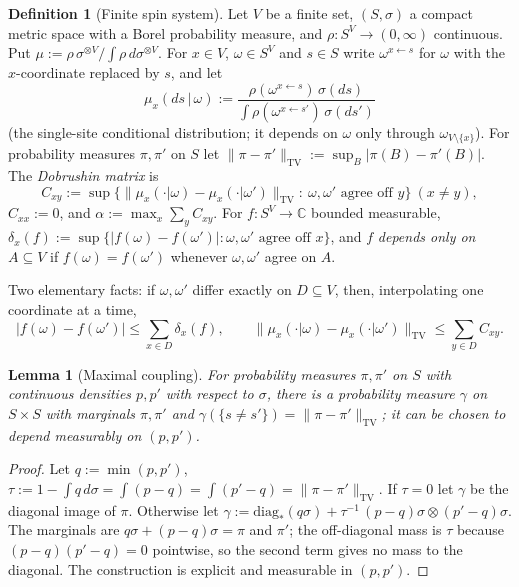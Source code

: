 \documentclass[11pt,a4paper]{article}
\newtheorem{lemma}[theorem]{Lemma}
\theoremstyle{definition}
\newtheorem{definition}[theorem]{Definition}
\theoremstyle{remark}
\newcommand{\C}{\mathbb{C}}
\newcommand{\norm}[1]{\lVert #1\rVert}
\newcommand{\TV}{\mathrm{TV}}
\begin{document}
\begin{definition}[Finite spin system]\label{def:spin}
Let $V$ be a finite set, $(S,\sigma)$ a compact metric space with a Borel probability measure, and
$\rho:S^V\to(0,\infty)$ continuous. Put $\mu:=\rho\,\sigma^{\otimes V}/\int\rho\,d\sigma^{\otimes V}$. For $x\in V$,
$\omega\in S^V$ and $s\in S$ write $\omega^{x\leftarrow s}$ for $\omega$ with the $x$-coordinate replaced by $s$, and let
\[
\mu_x(ds\,|\,\omega):=\frac{\rho(\omega^{x\leftarrow s})\,\sigma(ds)}{\int\rho(\omega^{x\leftarrow s'})\,\sigma(ds')}
\]
(the single-site conditional distribution; it depends on $\omega$ only through $\omega_{V\setminus\{x\}}$). For probability
measures $\pi,\pi'$ on $S$ let $\norm{\pi-\pi'}_\TV:=\sup_B|\pi(B)-\pi'(B)|$. The \emph{Dobrushin matrix} is
\[
C_{xy}:=\sup\bigl\{\norm{\mu_x(\cdot|\omega)-\mu_x(\cdot|\omega')}_\TV:\ \omega,\omega'\text{ agree off }y\bigr\}\ (x\ne y),
\]
$C_{xx}:=0$, and $\alpha:=\max_{x}\sum_yC_{xy}$.
For $f:S^V\to\C$ bounded measurable, $\delta_x(f):=\sup\{|f(\omega)-f(\omega')|:\omega,\omega'\text{ agree off }x\}$, and
$f$ \emph{depends only on} $A\subseteq V$ if $f(\omega)=f(\omega')$ whenever $\omega,\omega'$ agree on $A$.
\end{definition}

Two elementary facts: if $\omega,\omega'$ differ exactly on $D\subseteq V$, then, interpolating one coordinate at a time,
\begin{equation}\label{eq:interp}
|f(\omega)-f(\omega')|\le\sum_{x\in D}\delta_x(f),\qquad
\norm{\mu_x(\cdot|\omega)-\mu_x(\cdot|\omega')}_\TV\le\sum_{y\in D}C_{xy}.
\end{equation}

\begin{lemma}[Maximal coupling]\label{lem:coupling}
For probability measures $\pi,\pi'$ on $S$ with continuous densities $p,p'$ with respect to $\sigma$, there is a probability
measure $\gamma$ on $S\times S$ with marginals $\pi,\pi'$ and $\gamma(\{s\ne s'\})=\norm{\pi-\pi'}_\TV$; it can be chosen
to depend measurably on $(p,p')$.
\end{lemma}

\begin{proof}
Let $q:=\min(p,p')$, $\tau:=1-\int q\,d\sigma=\int(p-q)=\int(p'-q)=\norm{\pi-\pi'}_\TV$. If $\tau=0$ let $\gamma$ be the
diagonal image of $\pi$. Otherwise let $\gamma:=\mathrm{diag}_*(q\sigma)+\tau^{-1}\,(p-q)\sigma\otimes(p'-q)\sigma$. The marginals are
$q\sigma+(p-q)\sigma=\pi$ and $\pi'$; the off-diagonal mass is $\tau$ because $(p-q)(p'-q)=0$ pointwise, so the second term
gives no mass to the diagonal. The construction is explicit and measurable in $(p,p')$.
\end{proof}
\end{document}
